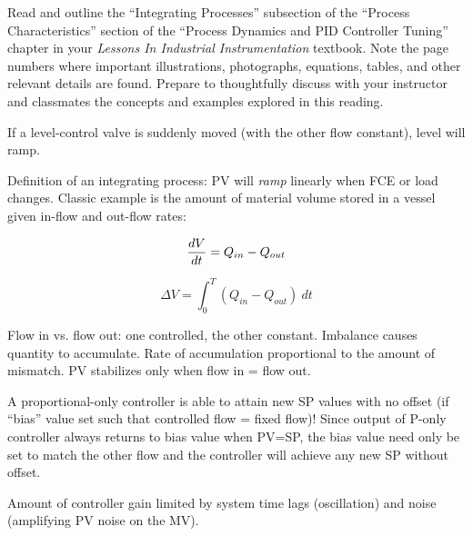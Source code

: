 

Read and outline the ``Integrating Processes'' subsection of the ``Process Characteristics'' section of the ``Process Dynamics and PID Controller Tuning'' chapter in your {\it Lessons In Industrial Instrumentation} textbook.  Note the page numbers where important illustrations, photographs, equations, tables, and other relevant details are found.  Prepare to thoughtfully discuss with your instructor and classmates the concepts and examples explored in this reading.














If a level-control valve is suddenly moved (with the other flow constant), level will ramp.

\vskip 10pt

Definition of an integrating process: PV will {\it ramp} linearly when FCE or load changes.  Classic example is the amount of material volume stored in a vessel given in-flow and out-flow rates:

$${dV \over dt} = Q_{in} - Q_{out}$$

$$\Delta V = \int_0^T (Q_{in} - Q_{out}) \> dt$$

Flow in vs. flow out: one controlled, the other constant.  Imbalance causes quantity to accumulate.  Rate of accumulation proportional to the amount of mismatch.  PV stabilizes only when flow in = flow out.

\vskip 10pt

A proportional-only controller is able to attain new SP values with no offset (if ``bias'' value set such that controlled flow = fixed flow)!  Since output of P-only controller always returns to bias value when PV=SP, the bias value need only be set to match the other flow and the controller will achieve any new SP without offset.

\vskip 10pt

Amount of controller gain limited by system time lags (oscillation) and noise (amplifying PV noise on the MV).

